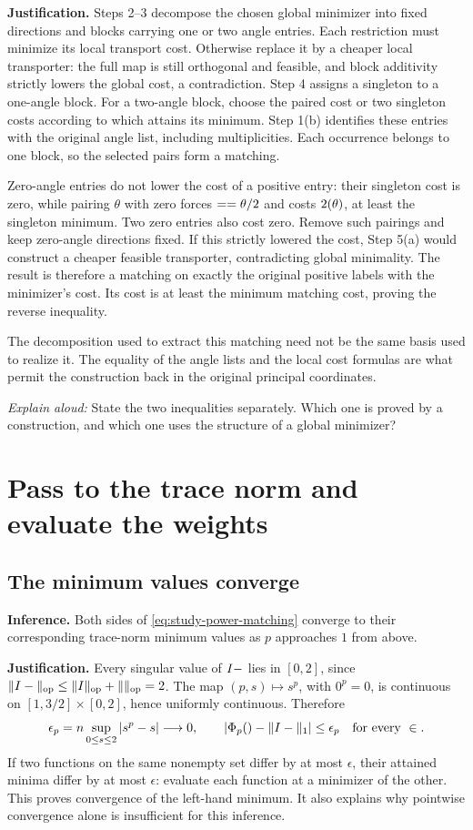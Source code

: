 \documentclass[11pt]{article}
\numberwithin{equation}{section}
\newcommand{\W}{\sym{Wcompetitor}}
\newcommand{\Wset}{\sym{FeasibleTransport}}
\newcommand{\Phicost}{\like{PowerCost}{\Phi_p}}
\newcommand{\fphase}{\sym{MatchingPhaseCost}}
\newcommand{\hmean}{\sym{PairMeanAngle}}
\newcommand{\dhalf}{\sym{PairHalfDifference}}
\newcommand{\why}{\par\smallskip\noindent\textbf{Justification.} }
\newcommand{\rehearse}[1]{\par\smallskip\noindent\textit{Explain aloud:} #1\par}
\begin{document}
\why Steps 2--3 decompose the chosen global minimizer into fixed
directions and blocks carrying one or two angle entries. Each restriction
must minimize its local transport cost. Otherwise replace it by a cheaper
local transporter: the full map is still orthogonal and feasible, and
block additivity strictly lowers the global cost, a contradiction.
Step 4 assigns a singleton to a one-angle block. For a two-angle block,
choose the paired cost or two singleton costs according to which attains
its minimum. Step 1(b) identifies these entries with the original angle
list, including multiplicities. Each occurrence belongs to one block,
so the selected pairs form a matching.

Zero-angle entries do not lower the cost of a positive entry: their
singleton cost is zero, while pairing $\theta$ with zero forces
$\dhalf=\hmean=\theta/2$ and costs $2\fphase(\theta)$, at least the
singleton minimum. Two zero entries also cost zero. Remove such pairings
and keep zero-angle directions fixed. If this strictly lowered the cost,
Step 5(a) would construct a cheaper feasible transporter, contradicting
global minimality. The result is therefore a matching on exactly
the original positive labels with the minimizer's cost. Its cost is at
least the minimum matching cost, proving the reverse inequality.

The decomposition used to extract this matching need not be the same
basis used to realize it. The equality of the angle lists and the local
cost formulas are what permit the construction back in the original
principal coordinates.
\rehearse{State the two inequalities separately. Which one is proved by
a construction, and which one uses the structure of a global minimizer?}

\section{Pass to the trace norm and evaluate the weights}

\subsection{The minimum values converge}
\textbf{Inference.} Both sides of \cref{eq:study-power-matching} converge
to their corresponding trace-norm minimum values as $p$ approaches $1$
from above.

\why Every singular value of $I-\W$ lies in $[0,2]$, since
$\|I-\W\|_{\mathrm{op}}\le\|I\|_{\mathrm{op}}+\|\W\|_{\mathrm{op}}=2$.
The map $(p,s)\mapsto s^p$, with $0^p=0$, is continuous on
$[1,3/2]\times[0,2]$, hence uniformly continuous. Therefore
\[
 \epsilon_p=n\sup_{0\le s\le2}|s^p-s|\longrightarrow0,
 \qquad
 |\Phicost(\W)-\|I-\W\|_1|\le\epsilon_p
 \quad\text{for every }\W\in\Wset.
\]
If two functions on the same nonempty set differ by at most $\epsilon$,
their attained minima differ by at most $\epsilon$: evaluate each
function at a minimizer of the other. This proves convergence of the
left-hand minimum. It also explains why pointwise convergence alone is
insufficient for this inference.
\end{document}
